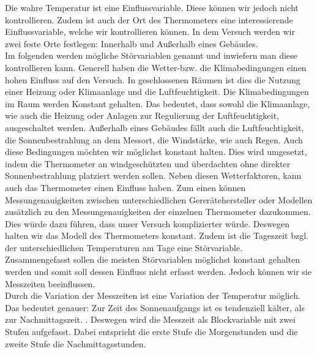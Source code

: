 \documentclass[ ngerman, fontsize= 12pt, paper=a4, headings=big, titlepage=true]{article}
\begin{document}
	Die wahre Temperatur ist eine Einflussvariable. Diese können wir jedoch nicht kontrollieren.  Zudem ist auch der Ort des Thermometers eine interessierende Einflussvariable, welche wir kontrollieren können. In dem Versuch werden wir zwei feste Orte festlegen: Innerhalb und Außerhalb eines Gebäudes. \\
	
	
	Im folgenden werden mögliche Störvariablen genannt und inwiefern man diese kontrollieren kann. Generell haben die Wetter-bzw. die Klimabedingungen einen hohen Einfluss auf den Versuch.  In geschlossenen Räumen ist dies die Nutzung einer Heizung oder Klimaanlage und die Luftfeuchtigkeit. Die Klimabedingungen im Raum werden Konstant gehalten. Das bedeutet, dass sowohl die Klimaanlage, wie auch die Heizung oder Anlagen zur Regulierung der Luftfeuchtigkeit, ausgeschaltet werden. Außerhalb eines Gebäudes fällt auch die Luftfeuchtigkeit, die Sonnenbestrahlung an dem Messort, die Windstärke, wie auch Regen. Auch diese Bedingungen möchten wir möglichst konstant halten. Dies wird umgesetzt, indem die Thermometer an windgeschützten und überdachten ohne direkter Sonnenbestrahlung platziert werden sollen. Neben diesen Wetterfaktoren, kann auch das Thermometer einen Einfluss haben. Zum einen können Messungenauigkeiten zwischen unterschiedlichen Gererätehersteller oder Modellen zusätzlich zu den Messungenauigkeiten der einzelnen Thermometer dazukommen. Dies würde dazu führen, dass unser Versuch komplizierter würde. Deswegen halten wir das Modell des Thermometers konstant. Zudem ist die Tageszeit bzgl. der unterschiedlichen Temperaturen am Tage eine Störvariable. \\
	
	Zusammengefasst sollen die meisten Störvariablen möglichst konstant gehalten werden und somit soll dessen Einfluss nicht erfasst werden. Jedoch können wir sie Messzeiten beeinflussen.  \\
	
	Durch die Variation der Messzeiten ist eine Variation der Temperatur möglich. Das bedeutet genauer: Zur Zeit des Sonnenaufgangs ist es tendenziell kälter, als zur Nachmittagszeit. \cite{WK2}. Deswegen wird die Messzeit als Blockvariable mit zwei Stufen aufgefasst. Dabei  entspricht die erste Stufe die Morgenstunden und die zweite Stufe die Nachmittagsstunden. 
	
\end{document}
